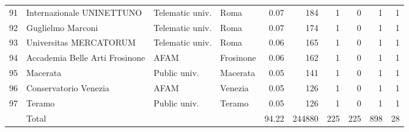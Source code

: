\documentclass[11pt,a4paper]{article}
\begin{document}
{\begin{longtable}{rlllrrrrrr}
91 & Internazionale UNINETTUNO & Telematic univ. & Roma & 0.07 & 184 & 1 & 0 & 1 & 1 \\
92 & Guglielmo Marconi & Telematic univ. & Roma & 0.07 & 174 & 1 & 0 & 1 & 1 \\
93 & Universitas MERCATORUM & Telematic univ. & Roma & 0.06 & 165 & 1 & 0 & 1 & 1 \\
94 & Accademia Belle Arti Frosinone & AFAM & Frosinone & 0.06 & 162 & 1 & 0 & 1 & 1 \\
95 & Macerata & Public univ. & Macerata & 0.05 & 141 & 1 & 0 & 1 & 1 \\
96 & Conservatorio Venezia & AFAM & Venezia & 0.05 & 126 & 1 & 0 & 1 & 1 \\
97 & Teramo & Public univ. & Teramo & 0.05 & 126 & 1 & 0 & 1 & 1 \\
\midrule
 & Total &  &  & 94.22 & 244880 & 225 & 225 & 898 & 28 \\
\bottomrule
\end{longtable}
}
\end{document}
